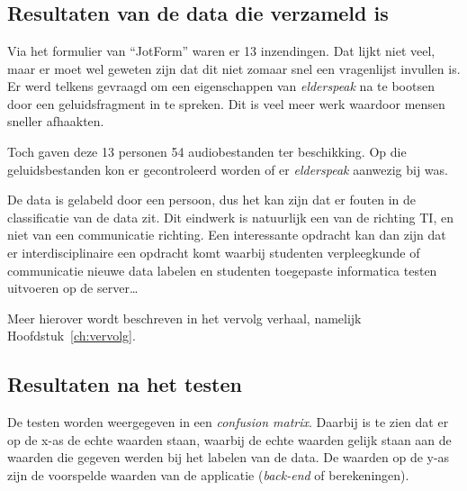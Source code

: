
\chapter{}
\label{ch:resultaten}

\section{Resultaten van de data die verzameld is}
Via het formulier van ``JotForm'' waren er 13 inzendingen. Dat lijkt niet veel, maar er moet wel geweten zijn dat dit niet zomaar snel een vragenlijst invullen is. Er werd telkens gevraagd om een eigenschappen van \textit{elderspeak} na te bootsen door een geluidsfragment in te spreken. Dit is veel meer werk waardoor mensen sneller afhaakten.

Toch gaven deze 13 personen 54 audiobestanden ter beschikking. Op die geluidsbestanden kon er gecontroleerd worden of er \textit{elderspeak} aanwezig bij was.

De data is gelabeld door een persoon, dus het kan zijn dat er fouten in de classificatie van de data zit. Dit eindwerk is natuurlijk een van de richting TI, en niet van een communicatie richting. Een interessante opdracht kan dan zijn dat er interdisciplinaire een opdracht komt waarbij studenten verpleegkunde of communicatie nieuwe data labelen en studenten toegepaste informatica testen uitvoeren op de server\ldots

Meer hierover wordt beschreven in het vervolg verhaal, namelijk Hoofdstuk~\ref{ch:vervolg}.

\section{Resultaten na het testen}
De testen worden weergegeven in een \textit{confusion matrix}. Daarbij is te zien dat er op de x-as de echte waarden staan, waarbij de echte waarden gelijk staan aan de waarden die gegeven werden bij het labelen van de data. De waarden op de y-as zijn de voorspelde waarden van de applicatie (\textit{back-end} of berekeningen).

